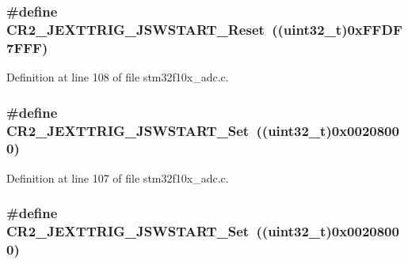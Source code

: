 \subsubsection[{\texorpdfstring{C\+R2\+\_\+\+J\+E\+X\+T\+T\+R\+I\+G\+\_\+\+J\+S\+W\+S\+T\+A\+R\+T\+\_\+\+Reset}{CR2_JEXTTRIG_JSWSTART_Reset}}]{\setlength{\rightskip}{0pt plus 5cm}\#define C\+R2\+\_\+\+J\+E\+X\+T\+T\+R\+I\+G\+\_\+\+J\+S\+W\+S\+T\+A\+R\+T\+\_\+\+Reset~(({\bf uint32\+\_\+t})0x\+F\+F\+D\+F7\+F\+F\+F)}\hypertarget{group___a_d_c___private___defines_gaaa2fb01c1649fde61115602559942ee2}{}\label{group___a_d_c___private___defines_gaaa2fb01c1649fde61115602559942ee2}


Definition at line 108 of file stm32f10x\+\_\+adc.\+c.

\subsubsection[{\texorpdfstring{C\+R2\+\_\+\+J\+E\+X\+T\+T\+R\+I\+G\+\_\+\+J\+S\+W\+S\+T\+A\+R\+T\+\_\+\+Set}{CR2_JEXTTRIG_JSWSTART_Set}}]{\setlength{\rightskip}{0pt plus 5cm}\#define C\+R2\+\_\+\+J\+E\+X\+T\+T\+R\+I\+G\+\_\+\+J\+S\+W\+S\+T\+A\+R\+T\+\_\+\+Set~(({\bf uint32\+\_\+t})0x00208000)}\hypertarget{group___a_d_c___private___defines_gaac5989ccf10d806f2f6a70f925d6b130}{}\label{group___a_d_c___private___defines_gaac5989ccf10d806f2f6a70f925d6b130}


Definition at line 107 of file stm32f10x\+\_\+adc.\+c.

\subsubsection[{\texorpdfstring{C\+R2\+\_\+\+J\+E\+X\+T\+T\+R\+I\+G\+\_\+\+J\+S\+W\+S\+T\+A\+R\+T\+\_\+\+Set}{CR2_JEXTTRIG_JSWSTART_Set}}]{\setlength{\rightskip}{0pt plus 5cm}\#define C\+R2\+\_\+\+J\+E\+X\+T\+T\+R\+I\+G\+\_\+\+J\+S\+W\+S\+T\+A\+R\+T\+\_\+\+Set~(({\bf uint32\+\_\+t})0x00208000)}\hypertarget{group___a_d_c___private___defines_gaac5989ccf10d806f2f6a70f925d6b130}{}\label{group___a_d_c___private___defines_gaac5989ccf10d806f2f6a70f925d6b130}


